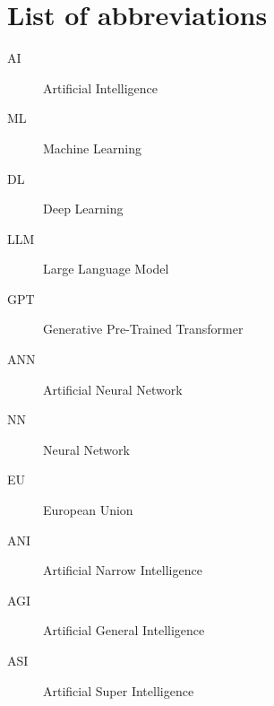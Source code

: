\section*{List of abbreviations}

\begin{description}
    \item[AI] Artificial Intelligence
\end{description}

\begin{description}
    \item[ML] Machine Learning
\end{description}

\begin{description}
    \item[DL] Deep Learning
\end{description}

\begin{description}
    \item[LLM] Large Language Model
\end{description}

\begin{description}
    \item[GPT] Generative Pre-Trained Transformer
\end{description}

\begin{description}
    \item[ANN] Artificial Neural Network
\end{description}

\begin{description}
    \item[NN] Neural Network 
\end{description}

\begin{description}
    \item[EU] European Union 
\end{description}

\begin{description}
    \item[ANI] Artificial Narrow Intelligence 
\end{description}

\begin{description}
    \item[AGI] Artificial General Intelligence 
\end{description}

\begin{description}
    \item[ASI] Artificial Super Intelligence
\end{description}